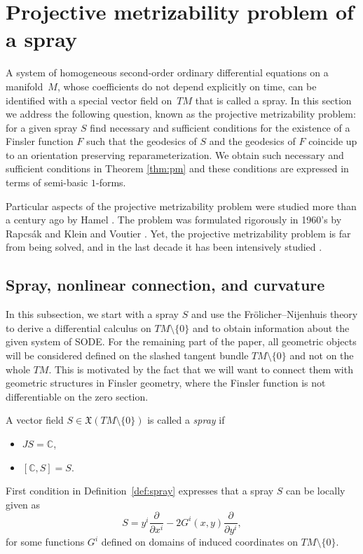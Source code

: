 \documentclass[pdftex]{sigma}
\numberwithin{equation}{section}
\begin{document}
\section{Projective metrizability problem of a spray}
\label{sec:pms}

A system of homogeneous second-order ordinary dif\/ferential equations
on a manifold~$M$, whose coef\/f\/icients do not depend explicitly on time, can be identif\/ied
with a special vector f\/ield on~$TM$ that is called a spray. In
this section we address the following question, known as the
projective metrizability problem: for a given spray $S$ f\/ind necessary
and suf\/f\/icient conditions for the existence of a Finsler function $F$
such that the geodesics of $S$ and the geodesics of $F$ coincide up to
an orientation preserving reparameterization. We obtain such necessary and
suf\/f\/icient conditions in Theorem \ref{thm:pm} and these conditions are expressed
in terms of semi-basic $1$-forms.

Particular aspects of the projective metrizability problem were studied more than a century ago by Hamel
\cite{hamel03}. The problem was formulated rigorously in 1960's by Rapcs\'ak
\cite{rapcsak62} and Klein and Voutier \cite{klein68}. Yet, the projective
metrizability problem is far from being solved, and in the last decade
it has been intensively studied \cite{paiva05, bucataru09,
  crampin07b, crampin08,  shen01, szilasi07,  szilasi02, yang11}.


\subsection{Spray, nonlinear connection, and curvature}
\label{subsec:sn}

In this subsection, we start with a spray $S$ and use the Fr\"olicher--Nijenhuis theory
to derive a dif\/ferential calculus on $TM\setminus\{0\}$ \cite{grifone72} and to
obtain information about the given system of SODE. For the remaining
part of the paper, all geometric objects will be considered def\/ined on
the slashed tangent bundle $TM\setminus\{0\}$ and not on the whole
$TM$. This is motivated by the fact that we will want to connect them
with geometric structures in Finsler geometry, where the Finsler
function is not dif\/ferentiable on the zero section.

\begin{Definition} \label{def:spray} A vector f\/ield $S\in{\mathfrak X}(TM\setminus\{0\})$
is called a \emph{spray} if
\begin{itemize}\itemsep=0pt
\item[i)] $JS=\mathbb{C}$,
\item[ii)] $[\mathbb{C}, S]=S$. \end{itemize}
\end{Definition}
First condition in Def\/inition~\ref{def:spray} expresses that a
spray $S$ can be locally given as
\[
 S=y^i\frac{\partial}{\partial x^i} - 2G^i(x,y) \frac{\partial}{\partial   y^i},
  \]
   for some functions $G^i$ def\/ined on domains of induced
coordinates on $TM\setminus\{0\}$.
\end{document}

